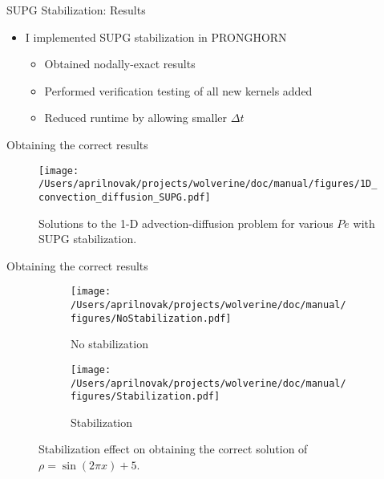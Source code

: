 \documentclass{beamer}
\begin{document}

\begin{frame}{SUPG Stabilization: Results}

\begin{itemize}
\item I implemented SUPG stabilization in PRONGHORN
	\begin{itemize}
		\item Obtained nodally-exact results
		\item Performed verification testing of all new kernels added
		\item Reduced runtime by allowing smaller \(\Delta t\)
	\end{itemize}
\end{itemize}

\end{frame}


\begin{frame}{Obtaining the correct results}

\begin{figure}[H]
  \centering
  \texttt{[image: /Users/aprilnovak/projects/wolverine/doc/manual/figures/1D\_convection\_diffusion\_SUPG.pdf]}
  \caption{Solutions to the 1-D advection-diffusion problem for various \(Pe\) with SUPG stabilization.}
\end{figure}

\end{frame}


\begin{frame}{Obtaining the correct results}

\begin{figure}[H]
\centering
\begin{subfigure}{.425\textwidth}
  \centering
  \texttt{[image: /Users/aprilnovak/projects/wolverine/doc/manual/figures/NoStabilization.pdf]}
  \caption{No stabilization}
\end{subfigure}
\begin{subfigure}{.425\textwidth}
  \centering
  \texttt{[image: /Users/aprilnovak/projects/wolverine/doc/manual/figures/Stabilization.pdf]}
  \caption{Stabilization}
\end{subfigure}
\caption{Stabilization effect on obtaining the correct solution of \(\rho=\sin{(2\pi x)}+5\). }
\end{figure}

\end{frame}
\end{document}
